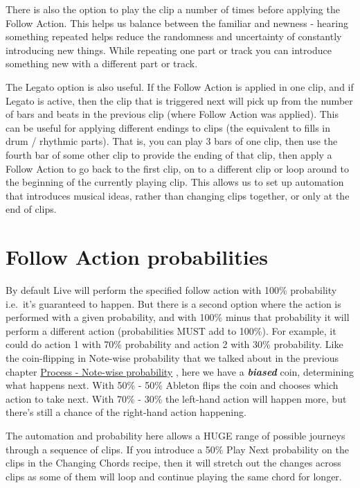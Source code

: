 \documentclass[
  12pt,
  letterpaper,
  oneside,
  open=any]{scrbook}
\begin{document}
There is also the option to play the clip a number of times before
applying the Follow Action. This helps us balance between the familiar
and newness - hearing something repeated helps reduce the randomness and
uncertainty of constantly introducing new things. While repeating one
part or track you can introduce something new with a different part or
track.

The Legato option is also useful. If the Follow Action is applied in one
clip, and if Legato is active, then the clip that is triggered next will
pick up from the number of bars and beats in the previous clip (where
Follow Action was applied). This can be useful for applying different
endings to clips (the equivalent to fills in drum / rhythmic parts).
That is, you can play 3 bars of one clip, then use the fourth bar of
some other clip to provide the ending of that clip, then apply a Follow
Action to go back to the first clip, on to a different clip or loop
around to the beginning of the currently playing clip. This allows us to
set up automation that introduces musical ideas, rather than changing
clips together, or only at the end of clips.

\section{Follow Action probabilities}\label{follow-action-probabilities}

By default Live will perform the specified follow action with 100\%
probability i.e.~it's guaranteed to happen. But there is a second option
where the action is performed with a given probability, and with 100\%
minus that probability it will perform a different action (probabilities
MUST add to 100\%). For example, it could do action 1 with 70\%
probability and action 2 with 30\% probability. Like the coin-flipping
in Note-wise probability that we talked about in the previous chapter
\hyperref[002-Process-Note_wise_probability]{Process - Note-wise
probability} , here we have a \textbf{\emph{biased}} coin, determining
what happens next. With 50\% - 50\% Ableton flips the coin and chooses
which action to take next. With 70\% - 30\% the left-hand action will
happen more, but there's still a chance of the right-hand action
happening.

The automation and probability here allows a HUGE range of possible
journeys through a sequence of clips. If you introduce a 50\% Play Next
probability on the clips in the Changing Chords recipe, then it will
stretch out the changes across clips as some of them will loop and
continue playing the same chord for longer.
\end{document}
